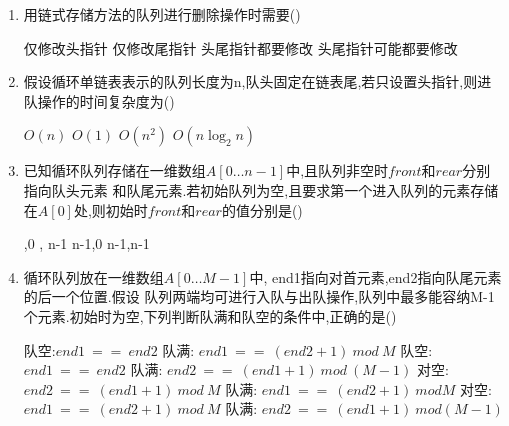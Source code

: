 \documentclass[12pt, a4paper, oneside, UTF8]{ctexbook}
\begin{document}
\begin{enumerate}
    \item 用链式存储方法的队列进行删除操作时需要() 
    \begin{choices}[2]
        \task 仅修改头指针
        \task 仅修改尾指针
        \task 头尾指针都要修改
        \task 头尾指针可能都要修改 
    \end{choices}


    \item 假设循环单链表表示的队列长度为n,队头固定在链表尾,若只设置头指针,则进队操作的时间复杂度为() 
    \begin{choices}
        \task $O(n) $ \task $O(1)$ \task $O(n^2)$ \task $O(n\log_{2}{n})$
    \end{choices}

    \item \bl 已知循环队列存储在一维数组$A[0\ldots n-1]$中,且队列非空时$front$和$rear$分别指向队头元素
    和队尾元素.若初始队列为空,且要求第一个进入队列的元素存储在$A[0]$处,则初始时$front$和$rear$的值分别是() 
    \begin{choices}
        ,0 , n-1 \task n-1,0 \task n-1,n-1
    \end{choices}

    \item 循环队列放在一维数组$A[0\ldots M-1]$中, end1指向对首元素,end2指向队尾元素的后一个位置.假设
    队列两端均可进行入队与出队操作,队列中最多能容纳M-1个元素.初始时为空,下列判断队满和队空的条件中,正确的是() 
    \begin{choices}[1]
        \task 队空:$end1\ ==\ end2$ 队满: $end1\ ==\ (end2+1)\ mod\ M$ 
        \task 队空:$end1\ ==\ end2$ 队满: $end2\ ==\ (end1+1)\ mod\ (M-1)$
        \task 对空:$end2\ ==\ (end1+1)\ mod\ M$ 队满: $end1\ ==\ (end2+1)\ mod M$
        \task 对空:$end1\ ==\ (end2+1)\ mod\ M$ 队满: $end2\ ==\ (end1+1)\ mod (M-1)$
    \end{choices}


\end{enumerate}
\end{document}
